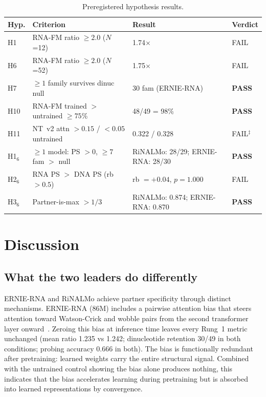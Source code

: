 \documentclass[11pt]{article}
\begin{document}
\begin{table}[htbp]
\centering
\caption{Preregistered hypothesis results.}
\label{tab:hypotheses}
\small
\begin{tabular}{llll}
\toprule
\textbf{Hyp.} & \textbf{Criterion} & \textbf{Result} & \textbf{Verdict} \\
\midrule
H1    & RNA-FM ratio $\geq 2.0$ ($N$=12) & 1.74$\times$ & FAIL \\
H6    & RNA-FM ratio $\geq 2.0$ ($N$=52) & 1.75$\times$ & FAIL \\
H7    & $\geq 1$ family survives dinuc null & 30 fam (ERNIE-RNA) & \textbf{PASS} \\
H10   & RNA-FM trained $>$ untrained $\geq 75$\% & 48/49 = 98\% & \textbf{PASS} \\
H11   & NT~v2 attn $> 0.15$ / $< 0.05$ untrained & 0.322 / 0.328 & FAIL$^\ddagger$ \\
\midrule
H1$_6$ & $\geq 1$ model: PS $> 0$, $\geq 7$ fam $>$ null & RiNALMo: 28/29; ERNIE-RNA: 28/30 & \textbf{PASS} \\
H2$_6$ & RNA PS $>$ DNA PS (rb $> 0.5$) & rb $= +0.04$, $p = 1.000$ & FAIL \\
H3$_6$ & Partner-is-max $> 1/3$ & RiNALMo: 0.874; ERNIE-RNA: 0.870 & \textbf{PASS} \\
\bottomrule
\end{tabular}

\smallskip{}
\end{table}


\section{Discussion}

\subsection{What the two leaders do differently}

ERNIE-RNA and RiNALMo achieve partner specificity through distinct
mechanisms. ERNIE-RNA (86M) includes a pairwise attention bias that
steers attention toward Watson-Crick and wobble pairs from the
second transformer layer onward~\citep{ernierna2025}. Zeroing this
bias at inference time leaves every Rung~1 metric unchanged (mean
ratio 1.235 vs 1.242; dinucleotide retention 30/49 in both
conditions; probing accuracy 0.666 in both). The bias is functionally
redundant after pretraining: learned weights carry the entire
structural signal. Combined with the untrained control showing the
bias alone produces nothing, this indicates that the bias accelerates
learning during pretraining but is absorbed into learned
representations by convergence.
\end{document}
